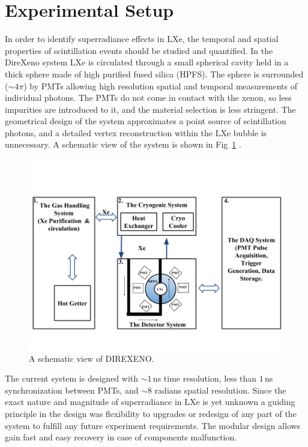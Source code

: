 \section{Experimental Setup}
\label{expSetup}


In order to identify superradiance effects in LXe, the temporal and spatial properties of scintillation events should be studied and quantified. In the DireXeno system LXe is circulated through a small spherical cavity held in a thick sphere made of high purified fused silica (HPFS). The sphere is surrounded ($\sim4\pi$) by PMTs allowing high resolution spatial and temporal measurements of individual photons. The PMTs do not come in contact with the xenon, so less impurities are introduced to it, and the material selection is less stringent. The geometrical design of the system approximates a point  source of scintillation photons, and a detailed vertex reconstruction within the LXe bubble is unnecessary. A schematic view of the system is shown in Fig~\ref{fig:detSch} . 

\begin{figure}[h]
\centerline{\includegraphics[width=0.8\linewidth]{DetSch.png}}
\caption{A schematic view of DIREXENO.}
\label{fig:detSch}
\end{figure}


The current system is designed with  $\sim1$\,ns time resolution, less than $1$\,ns synchronization between PMTs, and $\sim8$ radians spatial resolution. Since the exact nature and magnitude of superradiance in LXe is yet unknown a guiding principle in the design was flexibility to upgrades or redesign of any part of the system to fulfill any future experiment requirements. The modular design allows gain fast and easy recovery in case of components malfunction.


